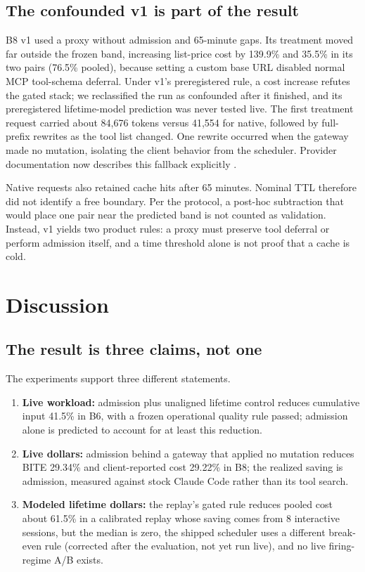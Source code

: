 \documentclass[10pt,twocolumn]{article}
\begin{document}
\subsection{The confounded v1 is part of the result}
\label{sec:b8v1}

B8 v1 used a proxy without admission and 65-minute gaps.  Its treatment moved far outside the frozen
band, increasing list-price cost by 139.9\% and 35.5\% in its two pairs (76.5\% pooled), because
setting a custom base URL disabled normal MCP tool-schema deferral.  Under v1's preregistered rule, a
cost increase refutes the gated stack; we reclassified the run as confounded after it finished, and its
preregistered lifetime-model prediction was never tested live.  The first treatment
request carried about 84,676 tokens versus 41,554 for native, followed by full-prefix rewrites as the
tool list changed.  One rewrite occurred when the gateway made no mutation, isolating the client
behavior from the scheduler.  Provider documentation now describes this fallback explicitly
\cite{anthropicMCP}.

Native requests also retained cache hits after 65 minutes.  Nominal TTL therefore did not identify a
free boundary.  Per the protocol, a post-hoc subtraction that would place one pair near the predicted
band is not counted as validation.  Instead, v1 yields two product rules: a proxy must preserve tool
deferral or perform admission itself, and a time threshold alone is not proof that a cache is cold.

\section{Discussion}

\subsection{The result is three claims, not one}

The experiments support three different statements.

\begin{enumerate}
  \item \textbf{Live workload:} admission plus unaligned lifetime control reduces cumulative input
  41.5\% in B6, with a frozen operational quality rule passed; admission alone is predicted to account
  for at least this reduction.
  \item \textbf{Live dollars:} admission behind a gateway that applied no mutation reduces BITE
  29.34\% and client-reported cost 29.22\% in B8; the realized saving is admission, measured against
  stock Claude Code rather than its tool search.
  \item \textbf{Modeled lifetime dollars:} the replay's gated rule reduces pooled cost about 61.5\% in
  a calibrated replay whose saving comes from 8 interactive sessions, but the median is zero, the
  shipped scheduler uses a different break-even rule (corrected after the evaluation, not yet run
  live), and no live firing-regime A/B exists.
\end{enumerate}
\end{document}
